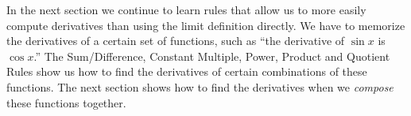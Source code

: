 In the next section we continue to learn rules that allow us to more easily compute derivatives than using the limit definition directly. We have to memorize the derivatives of a certain set of functions, such as ``the derivative of $\sin x$ is $\cos x$.'' The Sum/Difference, Constant Multiple, Power, Product and Quotient Rules show us how to find the derivatives of certain combinations of these functions. The next section shows how to find the derivatives when we \emph{compose} these functions together.

